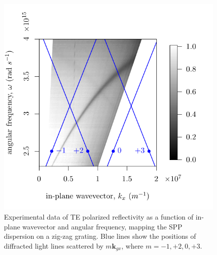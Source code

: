 \documentclass[oneside,11pt,book]{book}
\begin{document}
\begin{figure}
\begin{center}
\includegraphics[scale=1]{figure-TEdispersion-symZZ-Exp}
\caption{Experimental data of TE polarized reflectivity as a function of in-plane wavevector and angular frequency, mapping the SPP dispersion on a zig-zag grating. \color{blue}Blue \color{black} lines show the positions of diffracted light lines scattered by $m\mathbf{k}_{gx}$, where $m = −1, +2, 0, +3$.}
\end{center}
\end{figure}
\end{document}
